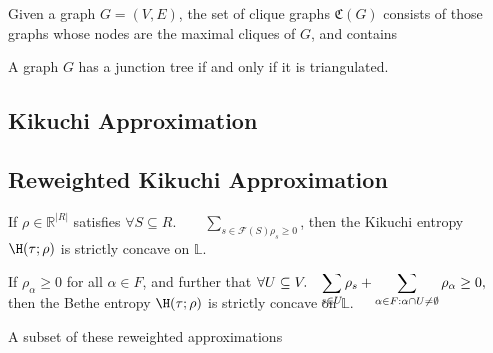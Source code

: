 \cite{wainwright2008graphical}

\begin{defn}
    Given a graph $G = (V,E)$, the set of clique graphs $\mathfrak{C}(G)$ consists
    of those graphs whose nodes are the maximal cliques of $G$, and contains 
\end{defn}

\begin{theorem}[Lauritzen {[153]}]
    A graph $G$ has a junction tree if and only if it is triangulated.
\end{theorem}




\subsection{Kikuchi Approximation}
\subsection{Reweighted Kikuchi Approximation}
\begin{theorem}
If $\rho \in \mathbb R^{|R|}$ satisfies $\forall S \subseteq R.\qquad \sum_{s \in \mathcal F(S) \rho_s \ge 0}$, then the Kikuchi entropy $\H(\tau;\rho)$ is strictly concave on $\mathbb L$.
\end{theorem}
\begin{coro}
If $\rho_\alpha \ge 0$ for all $\alpha \in F$, and further that
$\displaystyle \forall U \subseteq V.\quad \smash{\sum_{s \in U} \rho_s + \sum_{\alpha \in F : \alpha \cap U \ne \emptyset} \rho_\alpha} \ge 0, $
then the Bethe entropy $\H(\tau;\rho)$ is strictly concave on $\mathbb L$.
\end{coro}


A subset of these reweighted approximations

\begin{conj}

\end{conj}
